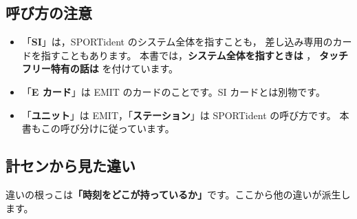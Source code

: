 \subsection*{呼び方の注意}

\begin{itemize}
\item 「\textbf{SI}」は，SPORTident のシステム全体を指すことも，
      差し込み専用のカードを指すこともあります。
      本書では，\textbf{システム全体を指すときは \tSI}，
      \textbf{タッチフリー特有の話は \tSIAC} を付けています。
\item 「\textbf{E カード}」は EMIT のカードのことです。SI カードとは別物です。
\item 「\textbf{ユニット}」は EMIT，「\textbf{ステーション}」は SPORTident の呼び方です。
      本書もこの呼び分けに従っています。
\end{itemize}

\subsection*{計センから見た違い}

違いの根っこは\textbf{「時刻をどこが持っているか」}です。ここから他の違いが派生します。

